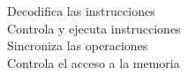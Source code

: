 \documentclass[preview]{standalone}
\begin{document}
Decodifica las instrucciones\\Controla y ejecuta instrucciones\\Sincroniza las operaciones\\Controla el acceso a la memoria\\
\end{document}
